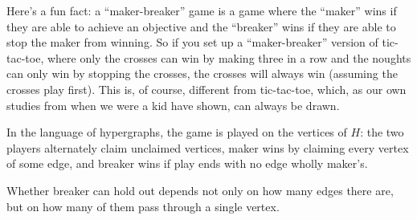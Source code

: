 Here's a fun fact: a ``maker-breaker'' game is a game where the ``maker'' wins if they are able to achieve an objective and the ``breaker'' wins if they are able to stop the maker from winning. So if you set up a ``maker-breaker'' version of tic-tac-toe, where only the crosses can win by making three in a row and the noughts can only win by stopping the crosses, the crosses will always win (assuming the crosses play first). This is, of course, different from tic-tac-toe, which, as our own studies from when we were a kid have shown, can always be drawn.

In the language of hypergraphs, the game is played on the vertices of $H$: the two players alternately claim unclaimed vertices, maker wins by claiming every vertex of some edge, and breaker wins if play ends with no edge wholly maker's.

Whether breaker can hold out depends not only on how many edges there are, but on how many of them pass through a single vertex.

